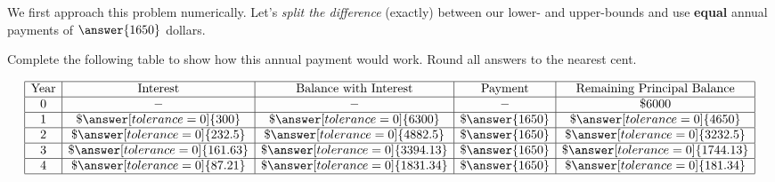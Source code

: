 \documentclass[handout,space,nooutcomes]{ximera}
\begin{document}
\newpage
\begin{question}
We first approach this problem numerically.  Let's \emph{split the difference} (exactly) between our lower- and upper-bounds and use  
\textbf{equal} annual payments of $\answer{1650}$ dollars.  

Complete the following table to show how this annual payment would work.  Round all answers to the nearest cent.


\[
  \begin{array}{|c|c|c|c|c|}
    \hline
    \text{Year} & \text{Interest}             & \text{Balance with Interest} & \text{Payment}    & \text{Remaining Principal Balance}\\ \hline
    0  &  -               & -                  &  -     & \$ 6000 \\ \hline
    1  & \$ \answer[tolerance=0]{300}    & \$ \answer[tolerance=0]{6300}    & \$ \answer{1650}  & \$ \answer[tolerance=0]{4650} \\ \hline
    2  & \$ \answer[tolerance=0]{232.5}    & \$ \answer[tolerance=0]{4882.5}    & \$ \answer{1650}  & \$ \answer[tolerance=0]{3232.5} \\ \hline
    3  & \$ \answer[tolerance=0]{161.63} & \$ \answer[tolerance=0]{3394.13} & \$ \answer{1650}  & \$ \answer[tolerance=0]{1744.13} \\ \hline
    4  & \$ \answer[tolerance=0]{87.21} & \$ \answer[tolerance=0]{1831.34} & \$ \answer{1650}  & \$ \answer[tolerance=0]{181.34} \\ \hline
  \end{array}
\]

\end{question}
\end{document}
